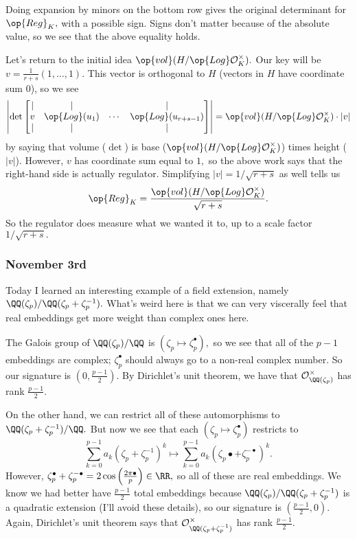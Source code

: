 Doing expansion by minors on the bottom row gives the original determinant for $\op{Reg}_K,$ with a possible sign. Signs don't matter because of the absolute value, so we see that the above equality holds.

Let's return to the initial idea $\op{vol}(H/\op{Log}\mathcal O_K^\times).$ Our key will be $v=\frac1{r+s}(1,\ldots,1).$ This vector is orthogonal to $H$ (vectors in $H$ have coordinate sum $0$), so we see
\[\left|\det\begin{bmatrix}
    | & | &  & | \\
    v & \op{Log}(u_1) & \cdots & \op{Log}(u_{r+s-1}) \\
    | & | &  & |
\end{bmatrix}\right|=\op{vol}(H/\op{Log}\mathcal O_K^\times)\cdot|v|\]
by saying that volume ($\det$) is base ($\op{vol}(H/\op{Log}\mathcal O_K^\times)$) times height ($|v|$). However, $v$ has coordinate sum equal to $1,$ so the above work says that the right-hand side is actually regulator. Simplifying $|v|=1/\sqrt{r+s}$ as well tells us
\[\op{Reg}_K=\frac{\op{vol}(H/\op{Log}\mathcal O_K^\times)}{\sqrt{r+s}}.\]
So the regulator does measure what we wanted it to, up to a scale factor $1/\sqrt{r+s}.$

\subsubsection{November 3rd}
Today I learned an interesting example of a field extension, namely $\QQ(\zeta_p)/\QQ(\zeta_p+\zeta_p^{-1}).$ What's weird here is that we can very viscerally feel that real embeddings get more weight than complex ones here.

The Galois group of $\QQ(\zeta_p)/\QQ$ is $(\zeta_p\mapsto\zeta_p^\bullet),$ so we see that all of the $p-1$ embeddings are complex; $\zeta_p^\bullet$ should always go to a non-real complex number. So our signature is $\left(0,\frac{p-1}2\right).$ By Dirichlet's unit theorem, we have that $\mathcal O_{\QQ(\zeta_p)}^\times$ has rank $\frac{p-1}2.$

On the other hand, we can restrict all of these automorphisms to $\QQ(\zeta_p+\zeta_p^{-1})/\QQ.$ But now we see that each $(\zeta_p\mapsto\zeta_p^\bullet)$ restricts to
\[\sum_{k=0}^{p-1}a_k\left(\zeta_p+\zeta_p^{-1}\right)^k\longmapsto\sum_{k=0}^{p-1}a_k\left(\zeta_p\bullet+\zeta_p^{-\bullet}\right)^k.\]
However, $\zeta_p^\bullet+\zeta_p^{-\bullet}=2\cos\left(\frac{2\pi\bullet}p\right)\in\RR,$ so all of these are real embeddings. We know we had better have $\frac{p-1}2$ total embeddings because $\QQ(\zeta_p)/\QQ(\zeta_p+\zeta_p^{-1})$ is a quadratic extension (I'll avoid these details), so our signature is $\left(\frac{p-1}2,0\right).$ Again, Dirichlet's unit theorem says that $\mathcal O_{\QQ(\zeta_p+\zeta_p^{-1})}^\times$ has rank $\frac{p-1}2.$


